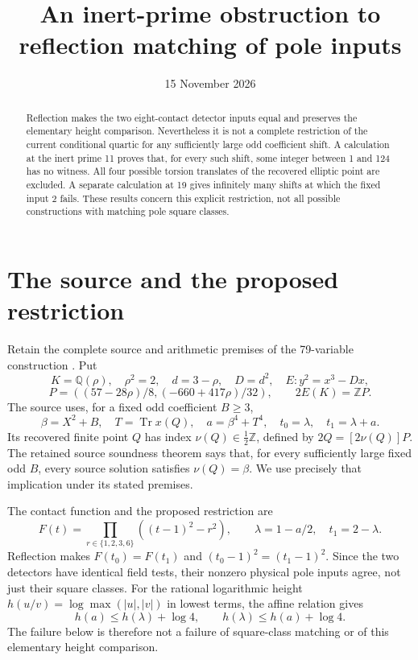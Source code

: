 \documentclass[11pt,a4paper]{article}
\title{An inert-prime obstruction to reflection matching of pole inputs}
\author{}\date{15 November 2026}
\newcommand{\Q}{\mathbb Q}\newcommand{\Z}{\mathbb Z}\newcommand{\F}{\mathbb F}\DeclareMathOperator{\Tr}{Tr}
\begin{document}
\maketitle
\begin{abstract}
Reflection makes the two eight-contact detector inputs equal and preserves
the elementary height comparison. Nevertheless it is not a complete
restriction of the current conditional quartic for any sufficiently large
odd coefficient shift. A calculation at the inert prime 11 proves that,
for every such shift, some integer between 1 and 124 has no witness.
All four possible torsion translates of the recovered elliptic point are
excluded. A separate calculation at 19 gives infinitely many shifts at which
the fixed input 2 fails. These results concern this explicit restriction,
not all possible constructions with matching pole square classes.
\end{abstract}

\section{The source and the proposed restriction}
Retain the complete source and arithmetic premises of the 79-variable
construction \cite{Q79}. Put
\[
 K=\Q(\rho),\quad \rho^2=2,\quad d=3-\rho,\quad D=d^2,
 \quad E:y^2=x^3-Dx,
\]
\[
 P=\left((57-28\rho)/8,(-660+417\rho)/32\right),\qquad
 2E(K)=\Z P.
\]
The source uses, for a fixed odd coefficient $B\ge3$,
\[
 \beta=X^2+B,\quad T=\Tr x(Q),\quad a=\beta^4+T^4,
 \quad t_0=\lambda,\quad t_1=\lambda+a.
\]
Its recovered finite point $Q$ has index $\nu(Q)\in\tfrac12\Z$, defined
by $2Q=[2\nu(Q)]P$. The retained source soundness theorem says that,
for every sufficiently large fixed odd $B$, every source solution satisfies
$\nu(Q)=\beta$. We use precisely that implication under its stated premises.

The contact function and the proposed restriction are
\begin{equation}\label{eq:reflection}
 F(t)=\prod_{r\in\{1,2,3,6\}}((t-1)^2-r^2),\qquad
 \lambda=1-a/2,\quad t_1=2-\lambda.
\end{equation}
Reflection makes $F(t_0)=F(t_1)$ and $(t_0-1)^2=(t_1-1)^2$.
Since the two detectors have identical field tests, their nonzero physical
pole inputs agree, not just their square classes. For the rational logarithmic
height $h(u/v)=\log\max(|u|,|v|)$ in lowest terms, the affine relation gives
\[
 h(a)\le h(\lambda)+\log4,\qquad
 h(\lambda)\le h(a)+\log4.
\]
The failure below is therefore not a failure of square-class matching or
of this elementary height comparison.
\end{document}
